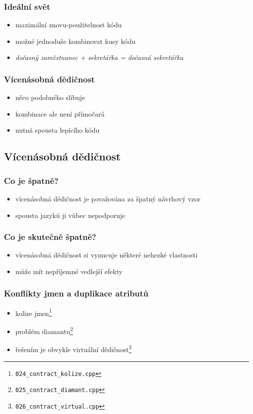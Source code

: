 \begin{frame}
	\frametitle{Ideální svět}
	\begin{itemize}
		\item{maximální znovu-použitelnost kódu}
		\item{možné jednoduše kombinovat kusy kódu}
		\item{\textit{dočasný zaměstnanec + sekretářka = dočasná sekretářka}}
	\end{itemize}
\end{frame}

\begin{frame}
	\frametitle{Vícenásobná dědičnost}
	\begin{itemize}
		\item{něco podobného slibuje}
		\item{kombinace ale není přímočará}
		\item{nutná spousta lepícího kódu}
	\end{itemize}
\end{frame}

\subsection{Vícenásobná dědičnost}

\begin{frame}
	\frametitle{Co je špatně?}
	\begin{itemize}
		\item{vícenásobná dědičnost je považována za špatný návrhový vzor}
		\item{spousta jazyků ji vůbec nepodporuje}
	\end{itemize}
\end{frame}

\begin{frame}
	\frametitle{Co je \textbf{skutečně} špatně?}
	\begin{itemize}
		\item{vícenásobná dědičnost si vynucuje některé nehezké vlastnosti}
		\item{může mít nepříjemné vedlejší efekty}
	\end{itemize}
\end{frame}

\begin{frame}
	\frametitle{Konflikty jmen a duplikace atributů}
	\begin{itemize}
		\item{kolize jmen\footnote{\texttt{024\_contract\_kolize.cpp}}}
		\item{problém diamantu\footnote{\texttt{025\_contract\_diamant.cpp}}}
		\item{řešením je obvykle virtuální dědičnost\footnote{\texttt{026\_contract\_virtual.cpp}}}
	\end{itemize}
\end{frame}

